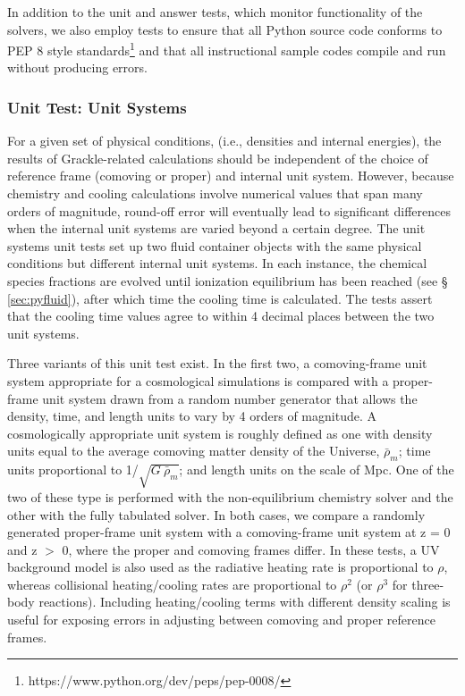 In addition to the unit and answer tests, which monitor functionality
of the solvers, we also employ tests to ensure that all Python source
code conforms to PEP 8 style
standards\footnote{https://www.python.org/dev/peps/pep-0008/} and that
all instructional sample codes compile and run without producing
errors.

\subsubsection{Unit Test: Unit Systems}
\label{sec:test-units}

For a given set of physical conditions, (i.e., densities and internal
energies), the results of Grackle-related calculations should be
independent of the choice of reference frame (comoving or proper) and
internal unit system.  However, because chemistry and cooling
calculations involve numerical values that span many orders of
magnitude, round-off error will eventually lead to significant
differences when the internal unit systems are varied beyond a certain
degree.  The unit systems unit tests set up two fluid container
objects with the same physical conditions but different internal unit
systems.  In each instance, the chemical species fractions are evolved
until ionization equilibrium has been reached (see \S
\ref{sec:pyfluid}), after which time the cooling time is calculated.
The tests assert that the cooling time values agree to within 4
decimal places between the two unit systems.

Three variants of this unit test exist.  In the first two, a
comoving-frame unit system appropriate for a cosmological simulations
is compared with a proper-frame unit system drawn from a random number
generator that allows the density, time, and length units to vary by 4
orders of magnitude.  A cosmologically appropriate unit system is
roughly defined as one with density units equal to the average
comoving matter density of the Universe, $\bar{\rho}_{m}$; time units
proportional to 1/$\sqrt{G\ \bar{\rho}_{m}}$; and length units on the
scale of Mpc.  One of the two of these type is performed with the
non-equilibrium chemistry solver and the other with the fully
tabulated solver.  In both cases, we compare a randomly generated
proper-frame unit system with a comoving-frame unit system at z = 0
and z $>$ 0, where the proper and comoving frames differ.  In these
tests, a UV background model is also used as the radiative heating
rate is proportional to $\rho$, whereas collisional heating/cooling
rates are proportional to $\rho^{2}$ (or $\rho^{3}$ for three-body
reactions).  Including heating/cooling terms with different density
scaling is useful for exposing errors in adjusting between comoving
and proper reference frames.

